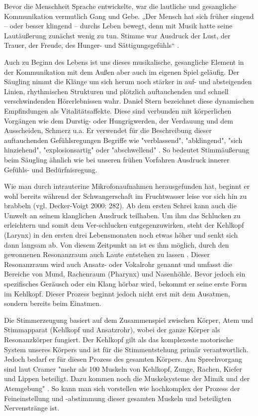 Bevor die Menschheit Sprache entwickelte, war die lautliche und gesangliche Kommunikation vermutlich Gang und Gebe. „Der Mensch hat sich früher singend – oder besser klingend – durchs Leben bewegt, denn mit Musik hatte seine Lautäußerung zunächst wenig zu tun. Stimme war Ausdruck der Lust, der Trauer, der Freude, des Hunger- und Sättigungsgefühls“ \autocite[8]{cramer1998}.

Auch zu Beginn des Lebens ist uns dieses musikalische, gesangliche Element in der Kommunikation mit dem Außen aber auch im eigenen Spiel geläufig. Der Säugling nimmt die Klänge um sich herum noch stärker in auf- und absteigenden Linien, rhythmischen Strukturen und plötzlich auftauchenden und schnell verschwindenden Hörerlebnissen wahr. Daniel Stern bezeichnet diese dynamischen Empfindungen als Vitalitätsaffekte. Diese sind verbunden mit körperlichen Vorgängen wie dem Durstig- oder Hungrigwerden, der Verdauung und dem Ausscheiden, Schmerz u.a. Er verwendet für die Beschreibung dieser auftauchenden Gefühlsregungen Begriffe wie "verblassend", "abklingend", "sich hinziehend", "explosionsartig" oder "abschwellend" \autocite[83]{stern2007}.
So bedeutet Stimmäußerung beim Säugling ähnlich wie bei unseren frühen Vorfahren Ausdruck innerer Gefühls- und Bedürfnisregung. 

Wie man durch intrauterine Mikrofonaufnahmen herausgefunden hat, beginnt er wohl bereits während der Schwangerschaft im Fruchtwasser leise vor sich hin zu brabbeln (vgl. Decker-Voigt 2000: 282). Ab dem ersten Schrei kann auch die Umwelt an seinem klanglichen Ausdruck teilhaben. Um ihm das Schlucken zu erleichtern und somit dem Ver-schlucken entgegenzuwirken, steht der Kehlkopf (Larynx) in den ersten drei Lebensmonaten noch etwas höher und senkt sich dann langsam ab. Von diesem Zeitpunkt an ist es ihm möglich, durch den gewonnenen Resonanzraum auch Laute entstehen zu lassen \autocite[vgl.][36]{cramer1998}. Dieser Resonanzraum wird auch Ansatz- oder Vokalrohr genannt und umfasst die Bereiche von Mund, Rachenraum (Pharynx) und Nasenhöhle. Bevor jedoch ein spezifisches Geräusch oder ein Klang hörbar wird, bekommt er seine erste Form im Kehlkopf. Dieser Prozess beginnt jedoch nicht erst mit dem Ausatmen, sondern bereits beim Einatmen. 

Die Stimmerzeugung basiert auf dem Zusammenspiel zwischen Körper, Atem und Stimmapparat (Kehlkopf und Ansatzrohr), wobei der ganze Körper als Resonanzkörper fungiert. Der Kehlkopf gilt als das komplexeste motorische System unseres Körpers und ist für die Stimmentstehung primär verantwortlich. Jedoch bedarf er für diesen Prozess des gesamten Körpers. Am Sprechvorgang sind laut Cramer "mehr als 100 Muskeln von Kehlkopf, Zunge, Rachen, Kiefer und Lippen beteiligt. Dazu kommen noch die Muskelsysteme der Mimik und der Atemgebung" \autocite[40]{cramer1998}. So kann man sich vorstellen wie hochkomplex der Prozess der Feineinstellung und -abstimmung dieser gesamten Muskeln und beteiligten Nervenstränge ist. 

